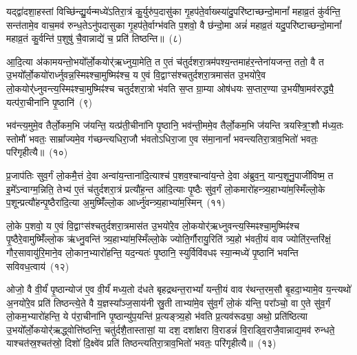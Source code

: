 यद्द्वा॑दशा॒हस्तां विच्छि॑न्द्यु॒र्यन्मध्ये॑\-ऽतिरा॒त्रं कु॒र्युरु॑प॒दासु॑का गृ॒हप॑ते॒र्वाख्स्या॑दु॒परि॑ष्टाच्छन्दो॒मानां᳚ महाव्र॒तं कु॑र्वन्ति॒ सन्त॑तामे॒व वाच॒मव॑ रुन्ध॒ते\-ऽनु॑पदासुका गृ॒हप॑ते॒र्वाग्भ॑वति प॒शवो॒ वै छ॑न्दो॒मा अन्नं॑ महाव्र॒तं यदु॒परि॑ष्टाच्छन्दो॒मानां᳚ महाव्र॒तं कु॒र्वन्ति॑ प॒शुषु॑ चै॒वान्नाद्ये॑ च॒ प्रति॑ तिष्ठन्ति॥~(८)\ip

{\anuvakamend[{वित॑ता॒ त्रिच॑त्वारिꣳशच्च}]}

आ॒दि॒त्या अ॑कामयन्तो॒भयो᳚र्लो॒कयोर्॑ऋध्नुया॒मेति॒ त ए॒तं च॑तुर्दशरा॒त्रम॑पश्य॒न्तमाह॑र॒न्तेना॑यजन्त॒ ततो॒ वै त उ॒भयो᳚र्लो॒कयो॑रार्ध्नुवन्न॒स्मिꣴश्चा॒मुष्मिꣴ॑श्च॒ य ए॒वं वि॒द्वाꣳस॑श्चतुर्दशरा॒त्रमास॑त उ॒भयो॑रे॒व लो॒कयोर्॑\mbox{}॑ध्नुवन्त्य॒\-स्मिꣴश्चा॒मुष्मिꣴ॑श्च चतुर्दशरा॒त्रो भ॑वति स॒प्त ग्रा॒म्या ओष॑धयः स॒प्तार॒ण्या उ॒भयी॑षा॒मव॑रुद्ध्यै॒ यत्प॑रा॒चीना॑नि पृ॒ष्ठानि॑~(९)\ip

भव॑न्त्य॒मुमे॒व तैर्लो॒कम॒भि ज॑यन्ति॒ यत्प्र॑ती॒चीना॑नि पृ॒ष्ठानि॒ भव॑न्ती॒ममे॒व तैर्लो॒कम॒भि ज॑यन्ति त्रयस्त्रि॒ꣳ॒शौ म॑ध्य॒तः स्तोमौ॑ भवतः॒ साम्रा᳚ज्यमे॒व ग॑च्छन्त्यधिरा॒जौ भ॑वतो\-ऽधिरा॒जा ए॒व स॑मा॒नानां᳚ भवन्त्यतिरा॒त्राव॒भितो॑ भवतः॒ परि॑गृहीत्यै॥~(१०)\ip

{\anuvakamend[{पृ॒ष्ठानि॒ चतु॑स्त्रिꣳशच्च}]}

प्र॒जा\-प॑तिः सुव॒र्गं लो॒कमै॒त्तं दे॒वा अन्वा॑य॒न्ताना॑दि॒त्याश्च॑ प॒शव॒श्चान्वा॑य॒न्ते दे॒वा अ॑ब्रुव॒न्॒ यान्प॒शूनु॒पाजी॑विष्म॒ त इ॒मे᳚\-ऽन्वाग्म॒न्निति॒ तेभ्य॑ ए॒तं च॑तुर्दशरा॒त्रं प्रत्यौ॑ह॒न्त आ॑दि॒त्याः पृ॒ष्ठैः सु॑व॒र्गं लो॒कमारो॑हन्त्र्य॒हाभ्या॑म॒स्मिँल्लो॒के प॒शून्प्रत्यौ॑हन्पृ॒ष्ठैरा॑दि॒त्या अ॒मुष्मिँ॑ल्लो॒क आर्ध्नु॑वन्त्र्य॒हाभ्या॑म॒स्मिन्~(११)\ip

लो॒के प॒शवो॒ य ए॒वं वि॒द्वाꣳस॑श्चतुर्दशरा॒त्रमास॑त उ॒भयो॑रे॒व लो॒कयोर्॑ऋध्नुवन्त्य॒स्मिꣴश्चा॒मुष्मिꣴ॑श्च पृ॒ष्ठैरे॒वामुष्मिँ॑ल्लो॒क ऋ॑ध्नु॒वन्ति॑ त्र्य॒हाभ्या॑म॒स्मिँल्लो॒के ज्योति॒र्गौरायु॒रिति॑ त्र्य॒हो भ॑वती॒यं वाव ज्योति॑र॒न्तरि॑क्षं॒ गौर॒सावायु॑रि॒माने॒व लो॒कान॒भ्यारो॑हन्ति॒ यद॒न्यतः॑ पृ॒ष्ठानि॒ स्युर्विवि॑वधꣴ स्या॒न्मध्ये॑ पृ॒ष्ठानि॑ भवन्ति सविवध॒त्वाय॑~(१२)\ip

ओजो॒ वै वी॒र्यं॑ पृ॒ष्ठान्योज॑ ए॒व वी॒र्यं॑ मध्य॒तो द॑धते बृहद्रथन्त॒रा\-भ्यां᳚ यन्ती॒यं वाव र॑थन्त॒रम॒सौ बृ॒हदा॒भ्यामे॒व य॒न्त्यथो॑ अ॒नयो॑रे॒व प्रति॑ तिष्ठन्त्ये॒ते वै य॒ज्ञस्या᳚ञ्ज॒साय॑नी स्रु॒ती ताभ्या॑मे॒व सु॑व॒र्गं लो॒कं य॑न्ति॒ परा᳚ञ्चो॒ वा ए॒ते सु॑व॒र्गं लो॒कम॒भ्यारो॑हन्ति॒ ये प॑रा॒चीना॑नि पृ॒ष्ठान्यु॑प॒यन्ति॑ प्र॒त्यङ्त्र्य॒हो भ॑वति प्र॒त्यव॑रूढ्या॒ अथो॒ प्रति॑ष्ठित्या उ॒भयो᳚र्लो॒कयोर्॑\mbox{}॑ऋद्ध्वोत्ति॑ष्ठन्ति॒ चतु॑र्दशै॒तास्तासां॒ या दश॒ दशा᳚क्षरा वि॒राडन्नं॑ वि॒राड्वि॒राजै॒वान्नाद्य॒मव॑ रुन्धते॒ याश्चत॑स्र॒श्चत॑स्रो॒ दिशो॑ दि॒क्ष्वे॑व प्रति॑ तिष्ठन्त्यतिरा॒त्राव॒भितो॑ भवतः॒ परि॑गृहीत्यै॥~(१३)\ip

